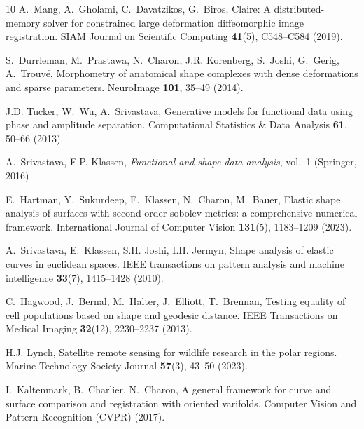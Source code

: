 \documentclass[pdflatex,iicol]{sn-jnl}%
\theoremstyle{thmstyleone}%
\theoremstyle{thmstyletwo}%
\theoremstyle{thmstylethree}%
\begin{document}
\begin{thebibliography}{10}
A.~Mang, A.~Gholami, C.~Davatzikos, G.~Biros, Claire: A distributed-memory solver for constrained large deformation diffeomorphic image registration.
\newblock SIAM Journal on Scientific Computing \textbf{41}(5), C548--C584 (2019).
\newblock {}

S.~Durrleman, M.~Prastawa, N.~Charon, J.R. Korenberg, S.~Joshi, G.~Gerig, A.~Trouv{\'e}, Morphometry of anatomical shape complexes with dense deformations and sparse parameters.
\newblock NeuroImage \textbf{101}, 35--49 (2014).
\newblock {}

J.D. Tucker, W.~Wu, A.~Srivastava, Generative models for functional data using phase and amplitude separation.
\newblock Computational Statistics \& Data Analysis \textbf{61}, 50--66 (2013).
\newblock {}

A.~Srivastava, E.P. Klassen, \emph{Functional and shape data analysis}, vol.~1 (Springer, 2016)

E.~Hartman, Y.~Sukurdeep, E.~Klassen, N.~Charon, M.~Bauer, Elastic shape analysis of surfaces with second-order sobolev metrics: a comprehensive numerical framework.
\newblock International Journal of Computer Vision \textbf{131}(5), 1183--1209 (2023).
\newblock {}

A.~Srivastava, E.~Klassen, S.H. Joshi, I.H. Jermyn, Shape analysis of elastic curves in euclidean spaces.
\newblock IEEE transactions on pattern analysis and machine intelligence \textbf{33}(7), 1415--1428 (2010).
\newblock {}

C.~Hagwood, J.~Bernal, M.~Halter, J.~Elliott, T.~Brennan, Testing equality of cell populations based on shape and geodesic distance.
\newblock IEEE Transactions on Medical Imaging \textbf{32}(12), 2230--2237 (2013).
\newblock {}

H.J. Lynch, Satellite remote sensing for wildlife research in the polar regions.
\newblock Marine Technology Society Journal \textbf{57}(3), 43--50 (2023).
\newblock {}

I.~Kaltenmark, B.~Charlier, N.~Charon, A general framework for curve and surface comparison and registration with oriented varifolds.
\newblock Computer Vision and Pattern Recognition (CVPR) (2017).
\newblock {}


\end{thebibliography}
\end{document}
